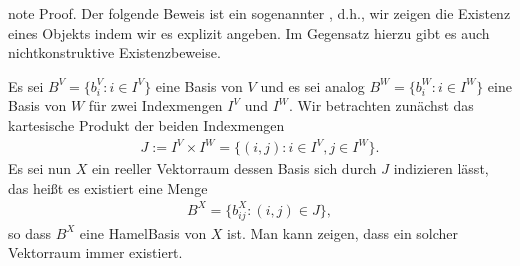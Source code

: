 \documentclass[letterpaper,10pt,english]{jupyterBook}
\begin{document}
\begin{sphinxadmonition}{note}
\sphinxAtStartPar
Proof. Der folgende Beweis ist ein sogenannter , d.h., wir zeigen die Existenz eines Objekts indem wir es explizit angeben.
Im Gegensatz hierzu gibt es auch nicht\sphinxhyphen{}konstruktive Existenzbeweise.

\sphinxAtStartPar
Es sei \(B^V = \{b_i^V: i\in I^V\}\) eine Basis von \(V\) und es sei analog \(B^W = \{b_i^W: i\in I^W\}\) eine Basis von \(W\) für zwei Indexmengen \(I^V\) und \(I^W\).
Wir betrachten zunächst das kartesische Produkt der beiden Indexmengen
\begin{equation*}
\begin{split}J := I^V \times I^W = \{(i,j): i\in I^V, j\in I^W\}.\end{split}
\end{equation*}
\sphinxAtStartPar
Es sei nun \(X\) ein reeller Vektorraum dessen Basis sich durch \(J\) indizieren lässt, das heißt es existiert eine Menge
\begin{equation*}
\begin{split}B^X = \{b_{ij}^X: (i,j)\in J\},\end{split}
\end{equation*}
\sphinxAtStartPar
so dass \(B^X\) eine Hamel\sphinxhyphen{}Basis von \(X\) ist.
Man kann zeigen, dass ein solcher Vektorraum immer existiert.


\end{sphinxadmonition}
\end{document}
